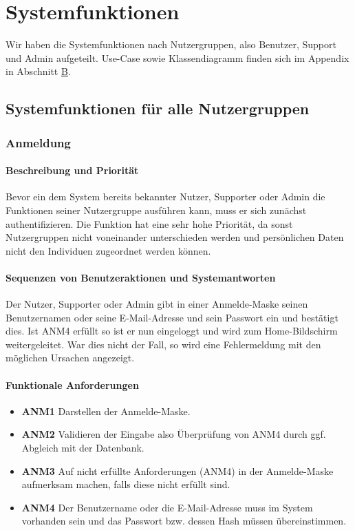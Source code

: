 \section{Systemfunktionen}
\label{system_features}

Wir haben die Systemfunktionen nach Nutzergruppen, also Benutzer, Support und Admin aufgeteilt. Use-Case sowie Klassendiagramm finden sich im Appendix in Abschnitt \hyperref[sec:app_modelle]{B}.

\subsection{Systemfunktionen für alle Nutzergruppen}
\subsubsection{Anmeldung}
\paragraph{Beschreibung und Priorität}

Bevor ein dem System bereits bekannter Nutzer, Supporter oder Admin die Funktionen seiner Nutzergruppe ausführen kann,
muss er sich zunächst authentifizieren.
Die Funktion hat eine sehr hohe Priorität, da sonst Nutzergruppen nicht voneinander unterschieden werden und persönlichen Daten nicht den Individuen zugeordnet werden können.

\paragraph{Sequenzen von Benutzeraktionen und Systemantworten}

Der Nutzer, Supporter oder Admin gibt in einer Anmelde-Maske seinen Benutzernamen oder seine E-Mail-Adresse und sein Passwort ein
und bestätigt dies.
Ist ANM4 erfüllt so ist er nun eingeloggt und wird zum Home-Bildschirm weitergeleitet.
War dies nicht der Fall, so wird eine Fehlermeldung mit den möglichen Ursachen angezeigt.

\paragraph{Funktionale Anforderungen}
\begin{itemize}
	\item \textbf{ANM1} Darstellen der Anmelde-Maske.
	\item \textbf{ANM2} Validieren der Eingabe also Überprüfung von ANM4 durch ggf. Abgleich mit der Datenbank.
	\item \textbf{ANM3} Auf nicht erfüllte Anforderungen (ANM4) in der Anmelde-Maske aufmerksam machen,
	      falls diese nicht erfüllt sind.
	\item \textbf{ANM4} Der Benutzername oder die E-Mail-Adresse muss im System vorhanden sein und das Passwort
	      bzw. dessen Hash müssen übereinstimmen.
\end{itemize}



